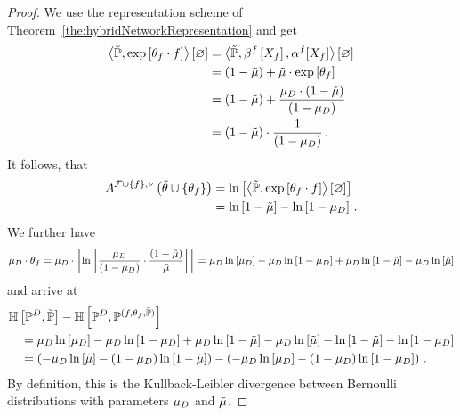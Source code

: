 \begin{proof}
    We use the representation scheme of Theorem~\ref{the:hybridNetworkRepresentation} and get %
    \begin{align*}
        \left\langle \tilde{\mathbb{P}}, \mathrm{exp}\left[\theta_{f} \cdot f\right]\right\rangle \left[ \varnothing \right]
        & = \left\langle \tilde{\mathbb{P}}, \beta^{f}\left[X_{f}\right], \alpha^{f}[X_{f}]\right\rangle \left[ \varnothing \right] \\
        & = (1-\tilde{\mu}) + \tilde{\mu}\cdot \mathrm{exp}\left[\theta_{f}\right] \\
        & = (1 - \tilde{\mu}) + \frac{\mu_{D} \cdot (1-\tilde{\mu})}{(1-\mu_{D})} \\
        & = (1-\tilde{\mu}) \cdot \frac{1}{(1-\mu_{D})} \, .
    \end{align*}
    It follows, that
    \begin{align*}
        A^{\mathcal{F}\cup\{f\},\nu}\left(\tilde{\theta}\cup\{\theta_{f}\}\right)
        & = \ln \left[ \left\langle \tilde{\mathbb{P}}, \mathrm{exp}\left[\theta_{f} \cdot f\right]\right\rangle \left[ \varnothing \right] \right] \\
        & = \ln \left[ 1-\tilde{\mu} \right] - \ln \left[ 1-\mu_{D} \right] \, .
    \end{align*}
    We further have
    \begin{align*}
        \mu_{D} \cdot \theta_{f}
        = \mu_{D} \cdot \left[ \ln \left[ \frac{\mu_{D}}{(1-\mu_{D})}\cdot \frac{(1-\tilde{\mu})}{\tilde{\mu}} \right]  \right]
        = \mu_{D} \ln \left[ \mu_{D} \right] - \mu_{D} \ln \left[ 1-\mu_{D} \right] + \mu_{D} \ln \left[ 1-\tilde{\mu} \right] - \mu_{D} \ln \left[ \tilde{\mu} \right]
    \end{align*}
    and arrive at
    \begin{align*}
        & \mathbb{H}\left[\mathbb{P}^{D},\tilde{\mathbb{P}}\right]
        - \mathbb{H}\left[\mathbb{P}^{D},\mathbb{P}^{(f,\theta_{f},\tilde{\mathbb{P}})}\right] \\
        & \quad =  \mu_{D} \ln \left[ \mu_{D} \right] - \mu_{D} \ln \left[ 1-\mu_{D} \right] + \mu_{D} \ln \left[ 1-\tilde{\mu} \right] - \mu_{D} \ln \left[ \tilde{\mu} \right]
        -  \ln \left[ 1-\tilde{\mu} \right] - \ln \left[ 1-\mu_{D} \right] \\
        & \quad = \left( -\mu_{D} \ln \left[ \tilde{\mu} \right] - (1-\mu_{D}) \ln \left[ 1-\tilde{\mu} \right] \right)  - \left( -\mu_{D} \ln \left[ \mu_{D} \right] - (1-\mu_{D}) \ln \left[ 1-\mu_{D} \right] \right) \, .
    \end{align*}
    By definition, this is the Kullback-Leibler divergence between Bernoulli distributions with parameters $\mu_{D}$ and $\tilde{\mu}$.

\end{proof}
